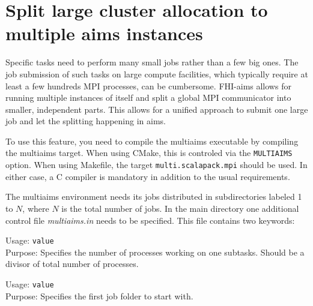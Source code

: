 \chapter[Multiple Instances of FHI-aims]{Split large cluster allocation to multiple
aims instances}
\label{appendix_multiaims}

Specific tasks need to perform many small jobs rather than a few big ones. The
job submission of such tasks on large compute facilities, which typically require
at least a few hundreds MPI processes, can be cumbersome. FHI-aims allows for
running multiple instances of itself and split a global MPI communicator into
smaller, independent parts. This allows for a unified approach to submit one
large job and let the splitting happening in aims.

To use this feature, you need to compile the multiaims executable by compiling
the multiaims target. When using CMake, this is controled via the
\texttt{MULTIAIMS} option. When using Makefile, the target
\texttt{multi.scalapack.mpi} should be used. In either case, a C compiler is
mandatory in addition to the usual requirements.

The multiaims environment needs its jobs distributed in subdirectories labeled
1 to $N$, where $N$ is the total number of jobs. In the main directory one
additional control file \textit{multiaims.in} needs to be specified. This file
contains two keywords:

{
  \noindent
  Usage:  \texttt{value} \\[1.0ex]
  Purpose: Specifies the number of processes working on one subtasks. Should be
    a divisor of total number of processes.
}

{
  \noindent
  Usage:  \texttt{value} \\[1.0ex]
  Purpose: Specifies the first job folder to start with.
}

